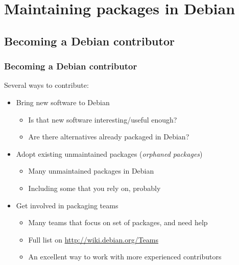 \documentclass[10pt,final]{beamer}
\begin{document}
\section{Maintaining packages in Debian}
\subsection{Becoming a Debian contributor}
\begin{frame}
\frametitle{Becoming a Debian contributor}
Several ways to contribute:
\hbr
\begin{itemize}
\item Bring new software to Debian
\begin{itemize}
\item Is that new software interesting/useful enough?
\item Are there alternatives already packaged in Debian?
\end{itemize}
\br
\item Adopt existing unmaintained packages (\textsl{orphaned packages})
\begin{itemize}
	\item Many unmaintained packages in Debian
	\item Including some that you rely on, probably
\end{itemize}
\br
\item Get involved in packaging teams
\begin{itemize}
\item Many teams that focus on set of packages, and need help
\item Full list on \url{http://wiki.debian.org/Teams}
\item An excellent way to work with more experienced contributors
\end{itemize}
\end{itemize}
\end{frame}
\end{document}
